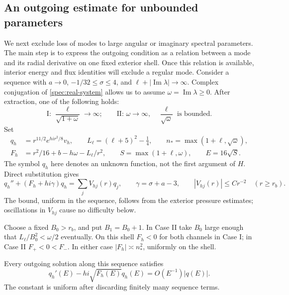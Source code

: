 \subsection{An outgoing estimate for unbounded parameters}

We next exclude loss of modes to large angular or imaginary spectral
parameters. The main step is to express the outgoing condition as a relation
between a mode and its radial derivative on one fixed exterior shell.
Once this relation is available, interior energy and flux identities will
exclude a regular mode. Consider a sequence with $a\to0$,
$-1/32\le\sigma\le4$, and
$\ell+|\operatorname{Im}\lambda|\to\infty$. Complex conjugation of
\eqref{spec:real-system} allows us to assume
$\omega=\operatorname{Im}\lambda\ge0$. After extraction, one of the
following holds:
\begin{equation}\label{spec:cases}
 \text{I: }\frac{\ell}{\sqrt{1+\omega}}\longrightarrow\infty;
 \qquad
 \text{II: }\omega\longrightarrow\infty,\quad
 \frac{\ell}{\sqrt\omega}\text{ is bounded}.
\end{equation}
Set
\begin{equation}\label{spec:high-definitions}
 \begin{split}
 q_h&=r^{11/2}e^{hi r^2/8}v_h,\qquad
 L_\ell=(\ell+5)^2-\tfrac14,\qquad n_* =\max(1+\ell,\sqrt\omega),\\
 F_h&=r^2/16+b-h\omega-L_\ell/r^2,
 \qquad S=\max(1+\ell,\omega),\qquad E=16\sqrt S.
 \end{split}
\end{equation}
The symbol $q_h$ here denotes an unknown function, not the first
argument of $H$. Direct substitution gives
\begin{equation}\label{spec:schrodinger-radial}
 q_h''+(F_h+hi\gamma)q_h=\sum_j V_{hj}(r)q_j,
 \qquad \gamma=\sigma+a-3,\qquad |V_{hj}(r)|\le Cr^{-2}
 \quad(r\ge r_b).
\end{equation}
The bound, uniform in the sequence, follows from the exterior pressure
estimates; oscillations in $V_{hj}$ cause no difficulty below.

Choose a fixed $B_0>r_b$, and put $B_1=B_0+1$. In Case II take $B_0$
large enough that $L_\ell/B_0^2<\omega/2$ eventually. On this shell
$F_h<0$ for both channels in Case I; in Case II $F_+<0<F_-$.
In either case $|F_h|\asymp n_*^2$, uniformly on the shell.

\begin{lemma}\label{spec:remote-data}
Every outgoing solution along this sequence satisfies
\begin{equation}\label{spec:remote-robin}
 q_h'(E)-hi\sqrt{F_h(E)}q_h(E)=O(E^{-1})|q(E)|.
\end{equation}
The constant is uniform after discarding finitely many sequence terms.
\end{lemma}

